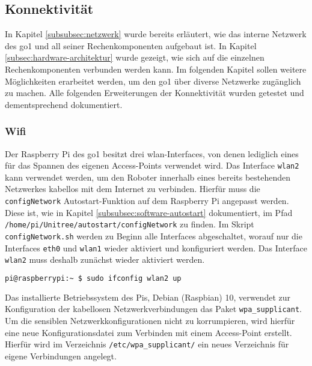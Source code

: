 \subsection{Konnektivität}
\label{subsec:konnektivitat}

In Kapitel \ref{subsubsec:netzwerk} wurde bereits erläutert, wie das interne Netzwerk des \gls{go1} und all seiner
Rechenkomponenten aufgebaut ist.
In Kapitel \ref{subsec:hardware-architektur} wurde gezeigt, wie sich auf die einzelnen Rechenkomponenten verbunden werden kann.
Im folgenden Kapitel sollen weitere Möglichkeiten erarbeitet werden, um den \gls{go1} über diverse Netzwerke zugänglich zu machen.
Alle folgenden Erweiterungen der Konnektivität wurden getestet und dementsprechend dokumentiert.

\subsubsection{Wifi}
\label{subsubsec:wifi}

Der Raspberry Pi des \gls{go1} besitzt drei \gls{wlan}-Interfaces, von denen lediglich eines für das Spannen des eigenen
Access-Points verwendet wird.
Das Interface \texttt{wlan2} kann verwendet werden, um den Roboter innerhalb eines bereits bestehenden Netzwerkes kabellos
mit dem Internet zu verbinden.
Hierfür muss die \texttt{configNetwork} Autostart-Funktion auf dem Raspberry Pi angepasst werden.
Diese ist, wie in Kapitel \ref{subsubsec:software-autostart} dokumentiert, im Pfad
\texttt{/home/\allowbreak pi/\allowbreak Unitree/\allowbreak autostart/\allowbreak configNetwork} zu finden.
Im Skript \texttt{configNetwork.sh} werden zu Beginn alle Interfaces abgeschaltet, worauf nur die Interfaces \texttt{eth0}
und \texttt{wlan1} wieder aktiviert und konfiguriert werden.
Das Interface \texttt{wlan2} muss deshalb zunächst wieder aktiviert werden.

\begin{lstlisting}[language=Bash]
pi@raspberrypi:~ $ sudo ifconfig wlan2 up
\end{lstlisting}


Das installierte Betriebssystem des Pis, Debian (Raspbian) \num{10}, verwendet zur Konfiguration der kabellosen Netzwerkverbindungen
das Paket \texttt{wpa\_supplicant}.
Um die sensiblen Netzwerkkonfigurationen nicht zu korrumpieren, wird hierfür eine neue Konfigurationsdatei zum Verbinden
mit einem Access-Point erstellt.
Hierfür wird im Verzeichnis \texttt{/etc/wpa\_supplicant/} ein neues Verzeichnis für eigene Verbindungen angelegt.

